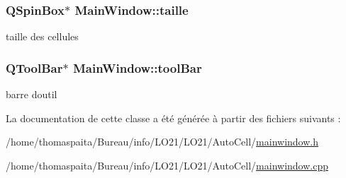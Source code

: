\subsubsection[{\texorpdfstring{taille}{taille}}]{\setlength{\rightskip}{0pt plus 5cm}Q\+Spin\+Box$\ast$ Main\+Window\+::taille\hspace{0.3cm}{\ttfamily [private]}}\hypertarget{class_main_window_a4ee0dd35b93263abed8d50c2517632e2}{}\label{class_main_window_a4ee0dd35b93263abed8d50c2517632e2}
taille des cellules 
\subsubsection[{\texorpdfstring{tool\+Bar}{toolBar}}]{\setlength{\rightskip}{0pt plus 5cm}Q\+Tool\+Bar$\ast$ Main\+Window\+::tool\+Bar\hspace{0.3cm}{\ttfamily [private]}}\hypertarget{class_main_window_a10d2a8149dc4da0a7df5ee9e4e189721}{}\label{class_main_window_a10d2a8149dc4da0a7df5ee9e4e189721}
barre d\textquotesingle{}outil 

La documentation de cette classe a été générée à partir des fichiers suivants \+:\begin{DoxyCompactItemize}
\item 
/home/thomaspaita/\+Bureau/info/\+L\+O21/\+L\+O21/\+Auto\+Cell/\hyperlink{mainwindow_8h}{mainwindow.\+h}\item 
/home/thomaspaita/\+Bureau/info/\+L\+O21/\+L\+O21/\+Auto\+Cell/\hyperlink{mainwindow_8cpp}{mainwindow.\+cpp}\end{DoxyCompactItemize}
